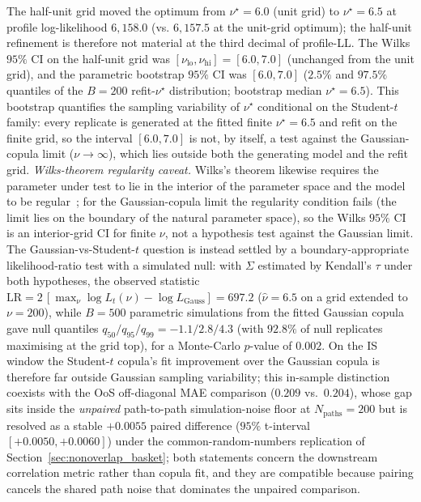 The half-unit grid moved the optimum from $\nu^\star = 6.0$ (unit grid) to $\nu^\star = 6.5$ at profile log-likelihood $6{,}158.0$ (vs. $6{,}157.5$ at the unit-grid optimum); the half-unit refinement is therefore not material at the third decimal of profile-LL. The Wilks $95\%$ CI on the half-unit grid was $[\nu_{\text{lo}}, \nu_{\text{hi}}] = [6.0, 7.0]$ (unchanged from the unit grid), and the parametric bootstrap $95\%$ CI was $[6.0, 7.0]$ ($2.5\%$ and $97.5\%$ quantiles of the $B = 200$ refit-$\nu^\star$ distribution; bootstrap median $\nu^\star = 6.5$). This bootstrap quantifies the sampling variability of $\nu^\star$ conditional on the Student-$t$ family: every replicate is generated at the fitted finite $\nu^\star = 6.5$ and refit on the finite grid, so the interval $[6.0, 7.0]$ is not, by itself, a test against the Gaussian-copula limit ($\nu \to \infty$), which lies outside both the generating model and the refit grid. \emph{Wilks-theorem regularity caveat.} Wilks's theorem likewise requires the parameter under test to lie in the interior of the parameter space and the model to be regular~\citep{wilks1938large, vandervaart1998asymptotic}; for the Gaussian-copula limit the regularity condition fails (the limit lies on the boundary of the natural parameter space), so the Wilks $95\%$ CI is an interior-grid CI for finite $\nu$, not a hypothesis test against the Gaussian limit. The Gaussian-vs-Student-$t$ question is instead settled by a boundary-appropriate likelihood-ratio test with a simulated null: with $\Sigma$ estimated by Kendall's $\tau$ under both hypotheses, the observed statistic $\mathrm{LR} = 2\,[\max_\nu \log L_t(\nu) - \log L_{\text{Gauss}}] = 697.2$ ($\hat\nu = 6.5$ on a grid extended to $\nu = 200$), while $B = 500$ parametric simulations from the fitted Gaussian copula gave null quantiles $q_{50}/q_{95}/q_{99} = -1.1 / 2.8 / 4.3$ (with $92.8\%$ of null replicates maximising at the grid top), for a Monte-Carlo $p$-value of $0.002$. On the IS window the Student-$t$ copula's fit improvement over the Gaussian copula is therefore far outside Gaussian sampling variability; this in-sample distinction coexists with the OoS off-diagonal MAE comparison ($0.209$ vs.\ $0.204$), whose gap sits inside the \emph{unpaired} path-to-path simulation-noise floor at $N_{\text{paths}} = 200$ but is resolved as a stable $+0.0055$ paired difference ($95\%$ t-interval $[+0.0050, +0.0060]$) under the common-random-numbers replication of Section~\ref{sec:nonoverlap_basket}; both statements concern the downstream correlation metric rather than copula fit, and they are compatible because pairing cancels the shared path noise that dominates the unpaired comparison.
